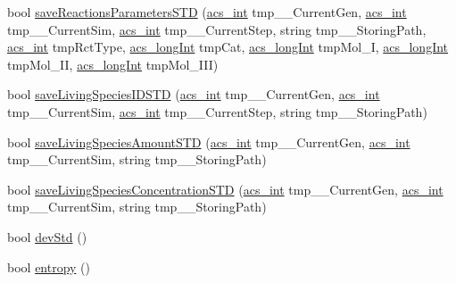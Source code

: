 \begin{DoxyCompactItemize}
bool \hyperlink{classenvironment_ad78fcf39a80e447a9aa2f84ab74335e5}{save\-Reactions\-Parameters\-S\-T\-D} (\hyperlink{acs__headers_8h_a8d277355641a098190360234e2ebde35}{acs\-\_\-int} tmp\-\_\-\-\_\-\-Current\-Gen, \hyperlink{acs__headers_8h_a8d277355641a098190360234e2ebde35}{acs\-\_\-int} tmp\-\_\-\-\_\-\-Current\-Sim, \hyperlink{acs__headers_8h_a8d277355641a098190360234e2ebde35}{acs\-\_\-int} tmp\-\_\-\-\_\-\-Current\-Step, string tmp\-\_\-\-\_\-\-Storing\-Path, \hyperlink{acs__headers_8h_a8d277355641a098190360234e2ebde35}{acs\-\_\-int} tmp\-Rct\-Type, \hyperlink{acs__headers_8h_a19319d75f02db4308bc5c0026d98cd85}{acs\-\_\-long\-Int} tmp\-Cat, \hyperlink{acs__headers_8h_a19319d75f02db4308bc5c0026d98cd85}{acs\-\_\-long\-Int} tmp\-Mol\-\_\-\-I, \hyperlink{acs__headers_8h_a19319d75f02db4308bc5c0026d98cd85}{acs\-\_\-long\-Int} tmp\-Mol\-\_\-\-I\-I, \hyperlink{acs__headers_8h_a19319d75f02db4308bc5c0026d98cd85}{acs\-\_\-long\-Int} tmp\-Mol\-\_\-\-I\-I\-I)
\item 
bool \hyperlink{classenvironment_a623c3cda23a18cb7b039c5a666408d72}{save\-Living\-Species\-I\-D\-S\-T\-D} (\hyperlink{acs__headers_8h_a8d277355641a098190360234e2ebde35}{acs\-\_\-int} tmp\-\_\-\-\_\-\-Current\-Gen, \hyperlink{acs__headers_8h_a8d277355641a098190360234e2ebde35}{acs\-\_\-int} tmp\-\_\-\-\_\-\-Current\-Sim, \hyperlink{acs__headers_8h_a8d277355641a098190360234e2ebde35}{acs\-\_\-int} tmp\-\_\-\-\_\-\-Current\-Step, string tmp\-\_\-\-\_\-\-Storing\-Path)
\item 
bool \hyperlink{classenvironment_a26c70b0a84c37c87952628d4a328c238}{save\-Living\-Species\-Amount\-S\-T\-D} (\hyperlink{acs__headers_8h_a8d277355641a098190360234e2ebde35}{acs\-\_\-int} tmp\-\_\-\-\_\-\-Current\-Gen, \hyperlink{acs__headers_8h_a8d277355641a098190360234e2ebde35}{acs\-\_\-int} tmp\-\_\-\-\_\-\-Current\-Sim, string tmp\-\_\-\-\_\-\-Storing\-Path)
\item 
bool \hyperlink{classenvironment_aedf8d90e1fe734948bf2213489840582}{save\-Living\-Species\-Concentration\-S\-T\-D} (\hyperlink{acs__headers_8h_a8d277355641a098190360234e2ebde35}{acs\-\_\-int} tmp\-\_\-\-\_\-\-Current\-Gen, \hyperlink{acs__headers_8h_a8d277355641a098190360234e2ebde35}{acs\-\_\-int} tmp\-\_\-\-\_\-\-Current\-Sim, string tmp\-\_\-\-\_\-\-Storing\-Path)
\item 
bool \hyperlink{classenvironment_ae7fd21d14f81c4854b3a6163b0278857}{dev\-Std} ()
\item 
bool \hyperlink{classenvironment_a4e9b60ec8b05e888cf0e55def03ee906}{entropy} ()
\end{DoxyCompactItemize}


